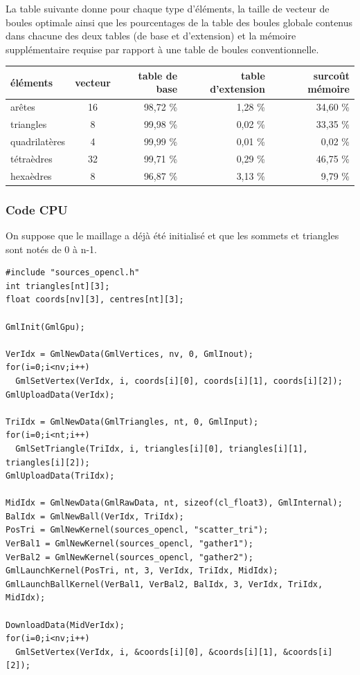 \documentclass[a4paper,12pt]{article}
\begin{document}
La table suivante donne pour chaque type d'éléments, la taille de vecteur de boules optimale ainsi que les pourcentages de la table des boules globale contenus dans chacune des deux tables (de base et d'extension) et la mémoire supplémentaire requise par rapport à une table de boules conventionnelle.
\medskip

\begin{tabular}{|l|c|r|r|r|}
\hline
éléments     & vecteur & table de base & table d'extension & surcoût mémoire \\
\hline
arêtes      &      16 &      98,72 \% &           1,28 \% & 34,60 \% \\
triangles    &       8 &      99,98 \% &           0,02 \% & 33,35 \% \\
quadrilatères &       4 &      99,99 \% &           0,01 \% &  0,02 \% \\
tétraèdres   &      32 &      99,71 \% &           0,29 \% & 46,75 \% \\
hexaèdres    &       8 &      96,87 \% &           3,13 \% &  9,79 \% \\
\hline
\end{tabular}

\subsubsection{Code CPU}
On suppose que le maillage a déjà été initialisé et que les sommets et triangles sont notés de 0 à n-1. 

\begin{tt}
\begin{verbatim}
#include "sources_opencl.h"
int triangles[nt][3];
float coords[nv][3], centres[nt][3];

GmlInit(GmlGpu);

VerIdx = GmlNewData(GmlVertices, nv, 0, GmlInout);
for(i=0;i<nv;i++)
  GmlSetVertex(VerIdx, i, coords[i][0], coords[i][1], coords[i][2]);
GmlUploadData(VerIdx);

TriIdx = GmlNewData(GmlTriangles, nt, 0, GmlInput);
for(i=0;i<nt;i++)
  GmlSetTriangle(TriIdx, i, triangles[i][0], triangles[i][1], triangles[i][2]);
GmlUploadData(TriIdx);

MidIdx = GmlNewData(GmlRawData, nt, sizeof(cl_float3), GmlInternal);
BalIdx = GmlNewBall(VerIdx, TriIdx);
PosTri = GmlNewKernel(sources_opencl, "scatter_tri");
VerBal1 = GmlNewKernel(sources_opencl, "gather1");
VerBal2 = GmlNewKernel(sources_opencl, "gather2");
GmlLaunchKernel(PosTri, nt, 3, VerIdx, TriIdx, MidIdx);
GmlLaunchBallKernel(VerBal1, VerBal2, BalIdx, 3, VerIdx, TriIdx, MidIdx);

DownloadData(MidVerIdx);
for(i=0;i<nv;i++)
  GmlSetVertex(VerIdx, i, &coords[i][0], &coords[i][1], &coords[i][2]);
\end{verbatim}
\end{tt}
\normalfont
\end{document}
